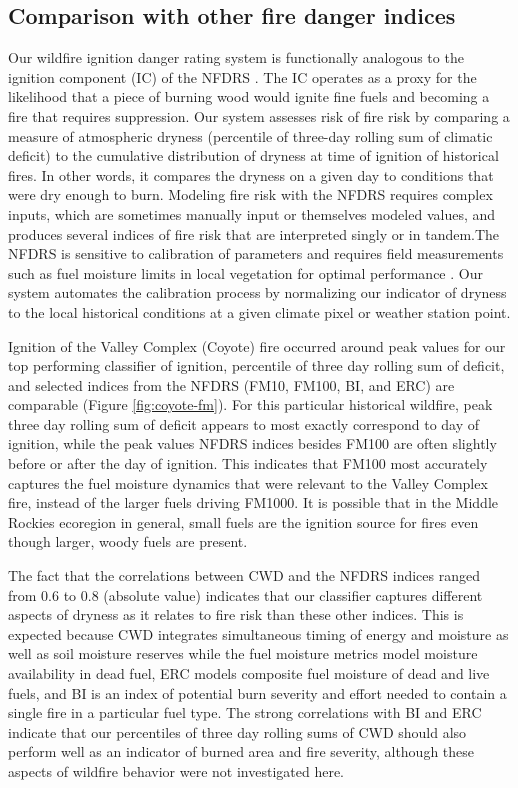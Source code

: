 \documentclass[11p]{article}
\begin{document}
\subsection{Comparison with other fire danger indices}

Our wildfire ignition danger rating system is functionally analogous to the ignition component (IC) of the NFDRS \citep{jollyModernizingUSNational2024}. The IC operates as a proxy for the likelihood that a piece of burning wood would ignite fine fuels and becoming a fire that requires suppression. Our system assesses risk of fire risk by comparing a measure of atmospheric dryness (percentile of three-day rolling sum of climatic deficit) to the cumulative distribution of dryness at time of ignition of historical fires. In other words, it compares the dryness on a given day to conditions that were dry enough to burn. Modeling fire risk with the NFDRS requires complex inputs, which are sometimes manually input or themselves modeled values, and produces several indices of fire risk that are interpreted singly or in tandem.The NFDRS is sensitive to calibration of parameters and requires field measurements such as fuel moisture limits in local vegetation for optimal performance \citep{jollyModernizingUSNational2024}. Our system automates the calibration process by normalizing our indicator of dryness to the local historical conditions at a given climate pixel or weather station point.

Ignition of the Valley Complex (Coyote) fire occurred around peak values for our top performing classifier of ignition, percentile of three day rolling sum of deficit, and selected indices from the NFDRS (FM10, FM100, BI, and ERC) are comparable (Figure \ref{fig:coyote-fm}). For this particular historical wildfire, peak three day rolling sum of deficit appears to most exactly correspond to day of ignition, while the peak values NFDRS indices besides FM100 are often slightly before or after the day of ignition. This indicates that FM100 most accurately captures the fuel moisture dynamics that were relevant to the Valley Complex fire, instead of the larger fuels driving FM1000. It is possible that in the Middle Rockies ecoregion in general, small fuels are the ignition source for fires even though larger, woody fuels are present.

The fact that the correlations between CWD and the NFDRS indices ranged from 0.6 to 0.8 (absolute value) indicates that our classifier captures different aspects of dryness as it relates to fire risk than these other indices. This is expected because CWD integrates simultaneous timing of energy and moisture as well as soil moisture reserves while the fuel moisture metrics model moisture availability in dead fuel, ERC models composite fuel moisture of dead and live fuels, and BI is an index of potential burn severity and effort needed to contain a single fire in a particular fuel type. The strong correlations with BI and ERC indicate that our percentiles of three day rolling sums of CWD should also perform well as an indicator of burned area and fire severity, although these aspects of wildfire behavior were not investigated here. 
\end{document}
